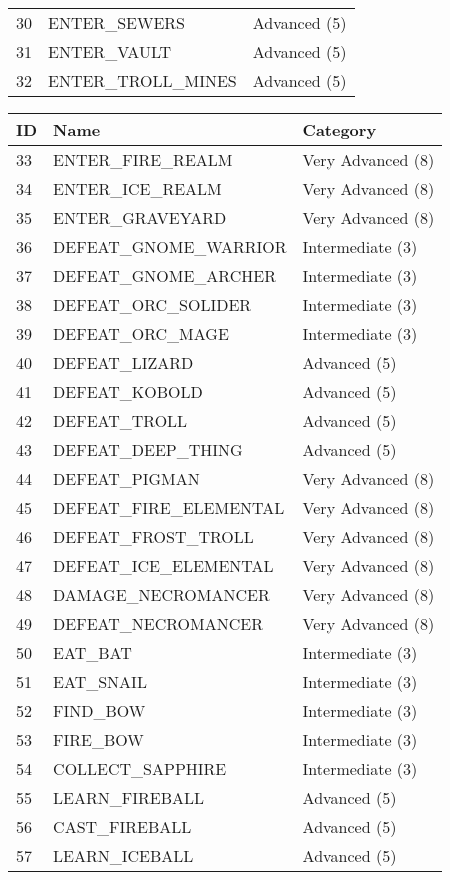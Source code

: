 \documentclass{article}
\theoremstyle{plain}
\theoremstyle{definition}
\theoremstyle{remark}
\begin{document}
\begin{table*}[t]
\begin{tabular}{@{}l l l@{}}
    30 & ENTER\_SEWERS & Advanced (5)\\
    31 & ENTER\_VAULT & Advanced (5)\\
    32 & ENTER\_TROLL\_MINES & Advanced (5)\\
    \bottomrule
\end{tabular}
\quad
\begin{tabular}{@{}l l l@{}} 
    \toprule
    \textbf{ID} & \textbf{Name} & \textbf{Category} \\
    \midrule
    33 & ENTER\_FIRE\_REALM & Very Advanced (8)\\
    34 & ENTER\_ICE\_REALM & Very Advanced (8)\\
    35 & ENTER\_GRAVEYARD & Very Advanced (8)\\
    36 & DEFEAT\_GNOME\_WARRIOR & Intermediate (3)\\
    37 & DEFEAT\_GNOME\_ARCHER & Intermediate (3)\\
    38 & DEFEAT\_ORC\_SOLIDER & Intermediate (3)\\
    39 & DEFEAT\_ORC\_MAGE & Intermediate (3)\\
    40 & DEFEAT\_LIZARD & Advanced (5)\\
    41 & DEFEAT\_KOBOLD & Advanced (5)\\
    42 & DEFEAT\_TROLL & Advanced (5)\\
    43 & DEFEAT\_DEEP\_THING & Advanced (5)\\
    44 & DEFEAT\_PIGMAN & Very Advanced (8)\\
    45 & DEFEAT\_FIRE\_ELEMENTAL & Very Advanced (8)\\
    46 & DEFEAT\_FROST\_TROLL & Very Advanced (8)\\
    47 & DEFEAT\_ICE\_ELEMENTAL & Very Advanced (8)\\
    48 & DAMAGE\_NECROMANCER & Very Advanced (8)\\
    49 & DEFEAT\_NECROMANCER & Very Advanced (8)\\
    50 & EAT\_BAT & Intermediate (3)\\
    51 & EAT\_SNAIL & Intermediate (3)\\
    52 & FIND\_BOW & Intermediate (3)\\
    53 & FIRE\_BOW & Intermediate (3)\\
    54 & COLLECT\_SAPPHIRE & Intermediate (3)\\
    55 & LEARN\_FIREBALL & Advanced (5)\\
    56 & CAST\_FIREBALL & Advanced (5)\\
    57 & LEARN\_ICEBALL & Advanced (5)\\

\end{tabular}
\end{table*}
\end{document}
